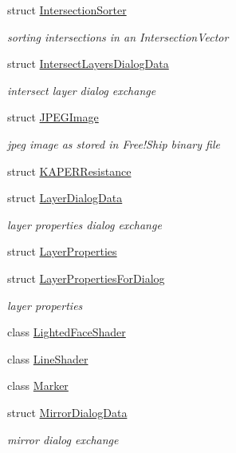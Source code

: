 \begin{DoxyCompactItemize}
struct \hyperlink{structShipCAD_1_1IntersectionSorter}{Intersection\+Sorter}
\begin{DoxyCompactList}\small\item\em sorting intersections in an Intersection\+Vector \end{DoxyCompactList}\item 
struct \hyperlink{structShipCAD_1_1IntersectLayersDialogData}{Intersect\+Layers\+Dialog\+Data}
\begin{DoxyCompactList}\small\item\em intersect layer dialog exchange \end{DoxyCompactList}\item 
struct \hyperlink{structShipCAD_1_1JPEGImage}{J\+P\+E\+G\+Image}
\begin{DoxyCompactList}\small\item\em jpeg image as stored in Free!\+Ship binary file \end{DoxyCompactList}\item 
struct \hyperlink{structShipCAD_1_1KAPERResistance}{K\+A\+P\+E\+R\+Resistance}
\item 
struct \hyperlink{structShipCAD_1_1LayerDialogData}{Layer\+Dialog\+Data}
\begin{DoxyCompactList}\small\item\em layer properties dialog exchange \end{DoxyCompactList}\item 
struct \hyperlink{structShipCAD_1_1LayerProperties}{Layer\+Properties}
\item 
struct \hyperlink{structShipCAD_1_1LayerPropertiesForDialog}{Layer\+Properties\+For\+Dialog}
\begin{DoxyCompactList}\small\item\em layer properties \end{DoxyCompactList}\item 
class \hyperlink{classShipCAD_1_1LightedFaceShader}{Lighted\+Face\+Shader}
\item 
class \hyperlink{classShipCAD_1_1LineShader}{Line\+Shader}
\item 
class \hyperlink{classShipCAD_1_1Marker}{Marker}
\item 
struct \hyperlink{structShipCAD_1_1MirrorDialogData}{Mirror\+Dialog\+Data}
\begin{DoxyCompactList}\small\item\em mirror dialog exchange \end{DoxyCompactList}\item 

\end{DoxyCompactItemize}
